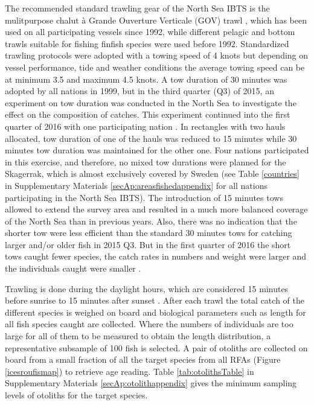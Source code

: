 \documentclass[a4paper 12pt]{article}
\numberwithin{equation}{section}
\begin{document}
The recommended standard trawling gear of the North Sea IBTS is the mulitpurpose chalut {\`a} Grande Ouverture Verticale (GOV) trawl \citep{ICES2012}, which has been used on all participating vessels since 1992, while different pelagic and bottom trawls suitable for fishing finfish species were used before 1992. Standardized trawling protocols were adopted with a towing speed of 4 knots but depending on vessel performance, tide and weather conditions the average towing speed can be at minimum 3.5 and maximum 4.5 knots. A tow duration of 30 minutes was adopted by all nations in 1999, but in the third quarter (Q3) of 2015, an experiment on tow duration was conducted in the North Sea to investigate the effect on the composition of catches. This experiment continued into the first quarter of 2016 with one participating nation \citep{ICES2016c}.  In rectangles with two hauls allocated, tow duration of one of the hauls was reduced to 15 minutes while 30 minutes tow duration was maintained for the other one. Four nations  participated in this exercise, and therefore, no mixed tow durations were planned for the Skagerrak, which is almost exclusively covered by Sweden (see Table \ref{countries} in Supplementary Materials \ref{secAp:areasfishedappendix} for all nations participating in the North Sea IBTS). The introduction of 15 minutes tows allowed to extend the survey area and resulted in a much more balanced coverage of the North Sea than in previous years. Also, there was no indication that the shorter tow were less efficient than the standard 30 minutes tows for catching larger and/or older fish in 2015 Q3. But in the first quarter of 2016 the short tows caught fewer species, the catch rates in numbers and weight were larger and the individuals caught were smaller  \citep[see][]{ICES2016c}. 

Trawling is done during the daylight hours, which are considered 15 minutes before sunrise to 15 minutes  after sunset \citep{ICES2012}. After each trawl the total catch of the different species is weighed on board and biological parameters such as length for all fish species caught are collected. Where the numbers of individuals are too large for all of them  to be measured to obtain the length distribution, a representative subsample of 100 fish is selected. A pair of otoliths are collected on board from a small fraction of all the target species from all RFAs (Figure \ref{icesroufismap}) to retrieve age reading. Table \ref{tab:otolithsTable} in Supplementary Materials \ref{secAp:otolithappendix} gives the minimum sampling levels of otoliths for the target species.
 
\end{document}
